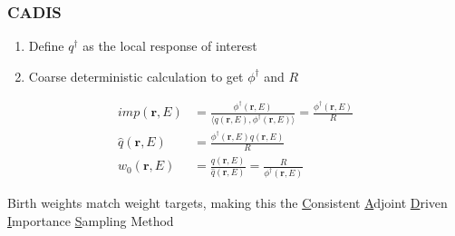 \documentclass[xcolor=x11names,compress]{beamer}
\renewcommand{\(}{\begin{columns}}
\renewcommand{\)}{\end{columns}}
\newcommand{\<}[1]{\begin{column}{#1}}
\renewcommand{\>}{\end{column}}
\newcommand{\ve}[1]{\ensuremath{\mathbf{#1}}}
\begin{document}
\begin{frame}[fragile]
  \frametitle{CADIS}
  
  \begin{enumerate}
  \item Define $q^{\dagger}$ as the local response of interest\\
  \item Coarse deterministic calculation to get $\phi^{\dagger}$ and $R$
  \end{enumerate}
% 
\begin{align}
  imp(\ve{r}, E) &= \frac{\phi^{\dagger}(\ve{r}, E)}{\langle q(\ve{r}, E), \phi^{\dagger}(\ve{r}, E) \rangle} = \frac{\phi^{\dagger}(\ve{r}, E)}{R} \\
  \hat{q}(\ve{r}, E) &= \frac{\phi^{\dagger}(\ve{r}, E) q(\ve{r}, E)}{R} \\
  w_0(\ve{r}, E) &= \frac{q(\ve{r}, E)}{\hat{q}(\ve{r}, E)} = \frac{R}{\phi^{\dagger}(\ve{r}, E)} 
  \label{eq:Importance}
\end{align}

Birth weights match weight targets, making this the \underline{C}onsistent \underline{A}djoint \underline{D}riven \underline{I}mportance \underline{S}ampling Method

\end{frame}
\end{document}
